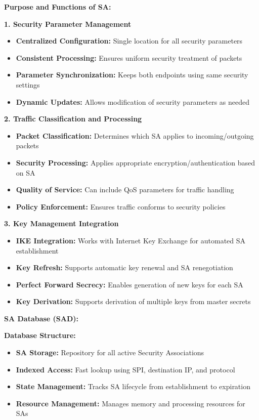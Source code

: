 \documentclass[12pt,a4paper]{article}
\begin{document}
\textbf{Purpose and Functions of SA:}

\textbf{1. Security Parameter Management}
\begin{itemize}
    \item \textbf{Centralized Configuration:} Single location for all security parameters
    \item \textbf{Consistent Processing:} Ensures uniform security treatment of packets
    \item \textbf{Parameter Synchronization:} Keeps both endpoints using same security settings
    \item \textbf{Dynamic Updates:} Allows modification of security parameters as needed
\end{itemize}

\textbf{2. Traffic Classification and Processing}
\begin{itemize}
    \item \textbf{Packet Classification:} Determines which SA applies to incoming/outgoing packets
    \item \textbf{Security Processing:} Applies appropriate encryption/authentication based on SA
    \item \textbf{Quality of Service:} Can include QoS parameters for traffic handling
    \item \textbf{Policy Enforcement:} Ensures traffic conforms to security policies
\end{itemize}

\textbf{3. Key Management Integration}
\begin{itemize}
    \item \textbf{IKE Integration:} Works with Internet Key Exchange for automated SA establishment
    \item \textbf{Key Refresh:} Supports automatic key renewal and SA renegotiation
    \item \textbf{Perfect Forward Secrecy:} Enables generation of new keys for each SA
    \item \textbf{Key Derivation:} Supports derivation of multiple keys from master secrets
\end{itemize}

\textbf{SA Database (SAD):}

\textbf{Database Structure:}
\begin{itemize}
    \item \textbf{SA Storage:} Repository for all active Security Associations
    \item \textbf{Indexed Access:} Fast lookup using SPI, destination IP, and protocol
    \item \textbf{State Management:} Tracks SA lifecycle from establishment to expiration
    \item \textbf{Resource Management:} Manages memory and processing resources for SAs
\end{itemize}
\end{document}
